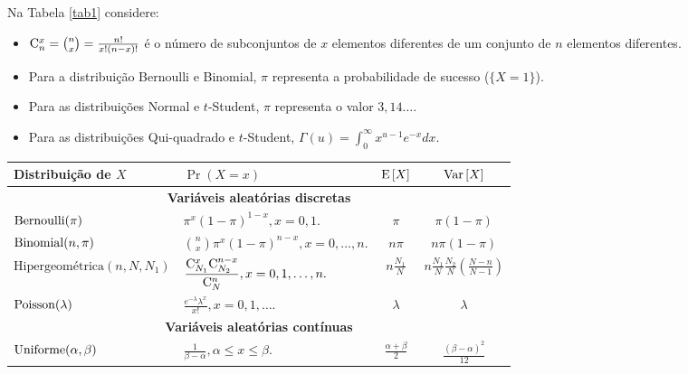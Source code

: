 \documentclass[10pt]{article}%
\renewcommand{\ra}[1]{\renewcommand{\arraystretch}{#1}}
\def\Var{{\rm Var}\,}
\def\E{{\rm E}\,}
\begin{document}
Na Tabela \ref{tab1} considere:
\begin{itemize}
\item ${\rm C}_n^x = {n \choose x} = \frac{n!}{x! (n - x)!}$ é o número de subconjuntos de $x$ elementos diferentes de um conjunto de $n$ elementos diferentes.
\item Para a distribuição Bernoulli e Binomial, $\pi$ representa a probabilidade de sucesso ($\{X = 1\}$).
\item Para as distribuições Normal e $t$-Student, $\pi$ representa o valor $3,14\ldots$.
\item Para as distribuições Qui-quadrado e $t$-Student, $\Gamma(u) = \int_0^{\infty}{x^{u-1}e^{-x}dx}$.
\end{itemize}
\begin{table*}[ht]\centering
\ra{1.3}
\caption{Distribuição de probabilidade, média e variância.}
\label{tab1}
\begin{tabular}{@{}llcc@{}}\toprule
Distribuição de $X$ & $\Pr(X = x)$ & $\E[X]$ & $\Var[X]$\\
\midrule
\multicolumn{4}{c}{\bf Variáveis aleatórias discretas}\\
\midrule
${\rm Bernoulli}(\pi)$ & $\displaystyle{\pi^x (1 - \pi)^{1 - x}, x = 0,1.}$ & $\pi$ & $\pi(1 - \pi)$\\
\midrule
${\rm Binomial}(n, \pi)$ & $\displaystyle{{n \choose x}\pi^x (1 - \pi)^{n - x}, x = 0,\ldots,n.}$ & $n\pi$ & $n\pi(1 - \pi)$\\
\midrule
$\mbox{Hipergeométrica}(n,N,N_1)$ & $\displaystyle{\frac{{\rm C}_{N_1}^x {\rm C}_{N_2}^{n-x}}{{\rm C}_N^n}, x = 0, 1, \ldots, n.}$& $\displaystyle{n\frac{N_1}{N}}$ & $\displaystyle{n\frac{N_1}{N}\frac{N_2}{N}}\left(\frac{N-n}{N-1}\right)$\\
\midrule
${\rm Poisson}(\lambda)$ & $\displaystyle{\frac{e^{-\lambda}\lambda^x}{x!}, x = 0, 1, \ldots.}$& $\lambda$ & $\lambda$\\
\midrule
\multicolumn{4}{c}{\bf Variáveis aleatórias contínuas}\\
\midrule
${\rm Uniforme}(\alpha,\beta)$ & $\displaystyle{\frac{1}{\beta-\alpha}, \alpha\leq x\leq \beta.}$ & $\displaystyle{\frac{\alpha + \beta}{2}}$ & $\displaystyle{\frac{(\beta - \alpha)^2}{12}}$\\

\end{tabular}
\end{table*}
\end{document}
